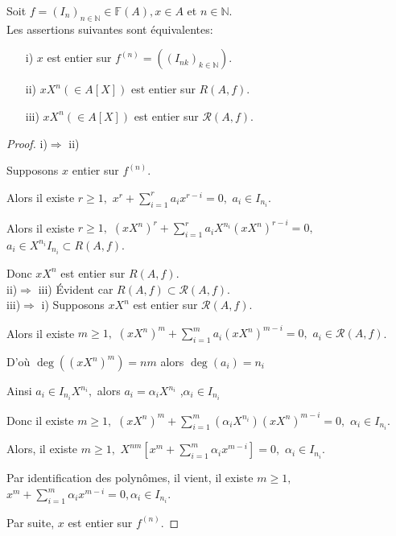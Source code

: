 \begin{maproposition}
	Soit $f=(I_n)_{n \in \mathbb{N}} \in \mathbb{F}(A), x \in A $ et $n \in \mathbb{N}$.\\
	Les assertions suivantes sont équivalentes:\\
	\begin{enumerate}
		\item[i)] $x$ est entier sur $f^{(n)}=((I_{nk})_{k \in \mathbb{N}})$.
		\item[ii)] $xX^n(\in A[X])$ est entier sur $R(A,f)$.
		\item[iii)] $xX^n(\in A[X])$ est entier sur $ \mathcal{R}(A,f)$.
	\end{enumerate}
	\begin{proof}
i)$\Rightarrow$ ii)

Supposons $x$ entier sur $f^{(n)}$.

Alors il existe $r\geq 1,$ $x^{r}+\sum\limits_{i=1}^{r}a_{i}x^{r-i}=0,$ $%
a_{i}\in I_{n_{i}}$.

Alors il existe $r\geq 1,$ $(xX^{n})^{r}+\sum%
\limits_{i=1}^{r}a_{i}X^{n_{i}}(xX^{n})^{r-i}=0,$ $a_{i}\in
X^{n_{i}}I_{n_{i}}\subset R(A,f)$.

Donc $xX^{n}$ est entier sur $R(A,f).$ \\

ii)$\Rightarrow$ iii) Évident car $R(A,f)\subset \mathcal{R}(A,f).$ \\
iii)$\Rightarrow$ i) Supposons $xX^{n}$ est entier sur $\mathcal{R}(A,f).$

Alors il existe $m\geq 1,$ $(xX^{n})^{m}+\sum\limits_{i=1}^{m}a_{i}(xX^{n})^{m-i}=0,$ $a_{i}\in \mathcal{R}(A,f)$.

D'où $\deg ((xX^{n})^{m})=nm$ alors $\deg (a_{i})=n_{i}$

Ainsi $a_{i}\in I_{n_{i}}X^{n_{i}},$ alors $a_{i}=\alpha _{i}X^{n_{i}}$ ,$\alpha _{i}\in I_{n_{i}}$

Donc il existe $m\geq 1,$ $(xX^{n})^{m}+\sum\limits_{i=1}^{m}(\alpha
_{i}X^{n_{i}})(xX^{n})^{m-i}=0,$ $\alpha _{i}\in I_{n_{i}}$.

Alors, il existe $m\geq 1,$ $X^{nm}[x^{m}+\sum\limits_{i=1}^{m}\alpha
_{i}x^{m-i}]=0,$ $\alpha _{i}\in I_{n_{i}}$.

Par identification des polynômes, il vient, il existe $m\geq 1,$ $%
x^{m}+\sum\limits_{i=1}^{m}\alpha _{i}x^{m-i}=0,\alpha _{i}\in I_{n_{i}}$.

Par suite, $x$ est entier sur $f^{(n)}$.
	\end{proof}
\end{maproposition}
